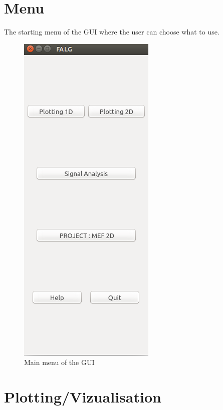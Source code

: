 \documentclass[a4paper]{report}
\begin{document}
\section{Menu}
The starting menu of the GUI where the user can choose what to use.
\begin{figure}[H]
\begin{center}
\includegraphics[scale=0.60]{menu.png}\caption{Main menu of the GUI}
\end{center}
\end{figure}

\section{Plotting/Vizualisation}
\end{document}
